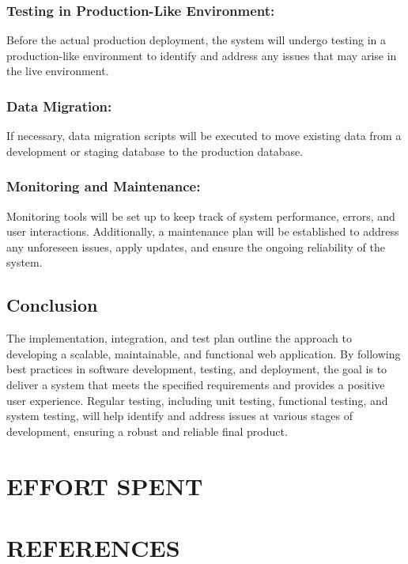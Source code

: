 \documentclass{article}
\begin{document}
\subsubsection*{Testing in Production-Like Environment:}
Before the actual production deployment, the system will undergo testing in a production-like environment to identify and address any issues that may arise in the live environment.

\subsubsection*{Data Migration:}
If necessary, data migration scripts will be executed to move existing data from a development or staging database to the production database.

\subsubsection*{Monitoring and Maintenance:}
Monitoring tools will be set up to keep track of system performance, errors, and user interactions. Additionally, a maintenance plan will be established to address any unforeseen issues, apply updates, and ensure the ongoing reliability of the system.

\subsection{Conclusion}

The implementation, integration, and test plan outline the approach to developing a scalable, maintainable, and functional web application. By following best practices in software development, testing, and deployment, the goal is to deliver a system that meets the specified requirements and provides a positive user experience. Regular testing, including unit testing, functional testing, and system testing, will help identify and address issues at various stages of development, ensuring a robust and reliable final product.

\section{EFFORT SPENT}



\section{REFERENCES}
\end{document}
